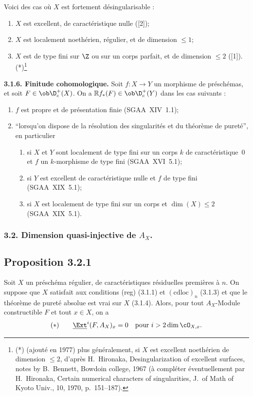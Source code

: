 Voici des cas où $X$ est fortement désingularisable :
\begin{enumerate}
\item[a)] $X$ est excellent, de caractéristique nulle ([2]);
\item[b)] $X$ est localement noethérien, régulier, et de dimension $\leqslant 1$;
\item[c)] $X$ est de type fini sur $\Z$ ou sur un corps parfait, et de dimension $\leqslant 2$ ([1]).(*)\footnote{(*) (ajouté en 1977) plus généralement, si $X$ est excellent noethérien de dimension $\leqslant 2$, d'après H.~Hironaka, Desingularization of excellent surfaces, notes by B.~Bennett, Bowdoin college, 1967 (à compléter éventuellement par H.~Hironaka, Certain numerical characters of singularities, J.~of Math of Kyoto Univ., 10, 1970, p.~151--187).}
\end{enumerate}

\textbf{3.1.6. Finitude cohomologique.} Soit $f : X \to Y$ un morphisme de préschémas, et soit $F \in \ob \D_c^{+}(X)$. On a $\mathbb{R} f_{*}(F) \in \ob \D_c^{+}(Y)$ dans les cas suivants :
\begin{enumerate}
\item[a)] $f$ est propre et de présentation finie (SGAA~XIV~1.1);
\item[b)] ``lorsqu'on dispose de la résolution des singularités et du théorème de pureté'', en particulier
\begin{enumerate}
\item[(i)] si $X$ et $Y$ sont localement de type fini sur un corps $k$ de caractéristique~0 et $f$ un $k$-morphisme de type fini (SGAA~XVI~5.1);
\item[(ii)] si $Y$ est excellent de caractéristique nulle et $f$ de type fini (SGAA~XIX~5.1);
\item[(iii)] si $X$ est localement de type fini sur un corps et $\dim(X) \leqslant 2$ (SGAA~XIX~5.1).
\end{enumerate}
\end{enumerate}

\subsubsection*{3.2. Dimension quasi-injective de \texorpdfstring{$A_X$}{A\_X}.}

\subsection*{Proposition 3.2.1}
Soit $X$ un préschéma régulier, de caractéristiques résiduelles premières à $n$. On suppose que $X$ satisfait aux conditions (reg) (3.1.1) et $(\mathrm{cdloc})_n$ (3.1.3) et que le théorème de pureté absolue est vrai sur $X$ (3.1.4). Alors, pour tout $A_X$-Module constructible $F$ et tout $x \in X$, on a
\[
(*) \qquad \underline{\Ext}^i(F, A_X)_x = 0 \quad \text{pour } i > 2\dim \cO_{X,x}.
\]

